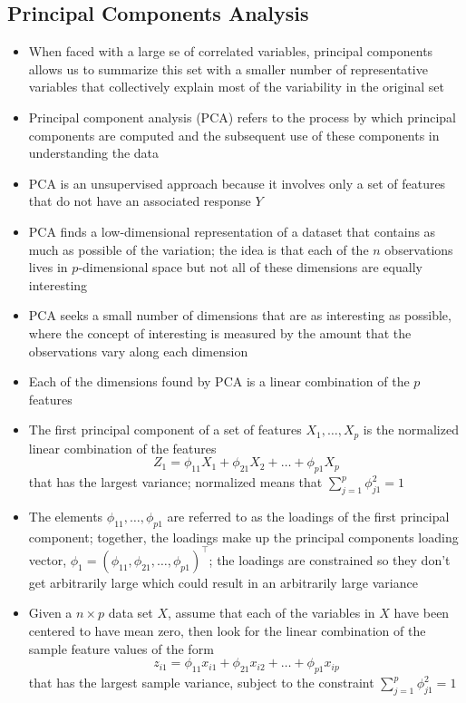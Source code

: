 \documentclass[12pt]{article}
\begin{document}
\subsection{Principal Components Analysis}
\begin{itemize} 
\item When faced with a large se of correlated variables, principal components allows us to summarize this set with a smaller number of representative variables that collectively explain most of the variability in the original set 
\item Principal component analysis (PCA) refers to the process by which principal components are computed and the subsequent use of these components in understanding the data 
\item PCA is an unsupervised approach because it involves only a set of features that do not have an associated response $Y$ 
\item PCA finds a low-dimensional representation of a dataset that contains as much as possible of the variation; the idea is that each of the $n$ observations lives in $p$-dimensional space but not all of these dimensions are equally interesting 
\item PCA seeks a small number of dimensions that are as interesting as possible, where the concept of interesting is measured by the amount that the observations vary along each dimension 
\item Each of the dimensions found by PCA is a linear combination of the $p$ features 
\item The first principal component of a set of features $X_1,\dots,X_p$ is the normalized linear combination of the features 
$$ Z_1 = \phi_{11}X_1 + \phi_{21}X_2 + \dots + \phi_{p1}X_p $$ that has the largest variance; normalized means that $\sum_{j=1}^p \phi_{j1}^2 = 1$
\item The elements $\phi_{11},\dots,\phi_{p1}$ are referred to as the loadings of the first principal component; together, the loadings make up the principal components loading vector, $\phi_1 = (\phi_{11}, \phi_{21},\dots,\phi_{p1})^\top$; the loadings are constrained so they don't get arbitrarily large which could result in an arbitrarily large variance 
\item Given a $n\times p$ data set $X$, assume that each of the variables in $X$ have been centered to have mean zero, then look for the linear combination of the sample feature values of the form $$ z_{i1} = \phi_{11}x_{i1} + \phi_{21}x_{i2} + \dots + \phi_{p1}x_{ip} $$ that has the largest sample variance, subject to the constraint $\sum_{j=1}^p \phi_{j1}^2 = 1$

\end{itemize}
\end{document}
